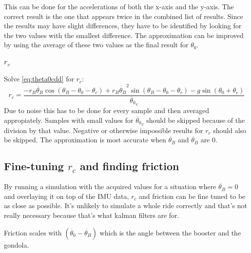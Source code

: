 \documentclass[titlepage]{article}
\numberwithin{equation}{section}
\begin{document}
\noindent
This can be done for the accelerations of both the x-axis and the y-axis. The correct result is the one that appears twice in the combined list of results. Since the results may have slight differences, they have to be identified by looking for the two values with the smallest difference. The approximation can be improved by using the average of these two values as the final result for $\theta_0$.

\subsubsection{$r_c$}
Solve \ref{eq:theta0cdd} for $r_c$:
\begin{equation}
r_c =
    \frac{
        - r_B \ddot{\theta_B} \cos{(\theta_B - \theta_0 - \theta_c)}
        + r_B \dot{\theta_B}^2 \sin{(\theta_B - \theta_0 - \theta_c)}
        - g \sin{(\theta_0 + \theta_c)}
    } {
        \ddot{\theta_0}_c
    } 
\end{equation}
Due to noise this has to be done for every sample and then averaged appropiately. Samples with small values for $\ddot{\theta_0}_c$ should be skipped because of the division by that value. Negative or otherwise impossible results for $r_c$ should also be skipped. The approximation is most accurate when $\dot{\theta_B}$ and $\ddot{\theta_B}$ are $0$.

\subsection{Fine-tuning $r_c$ and finding friction}
By running a simulation with the acquired values for a situation where $\ddot{\theta_B} = 0$ and overlaying it on top of the IMU data, $r_c$ and friction can be fine tuned to be as close as possible. It's unlikely to simulate a whole ride correctly and that's not really necessary because that's what kalman filters are for.

\noindent
Friction scales with $(\dot{\theta_0} - \dot{\theta_B})$ which is the angle between the booster and the gondola.
\end{document}
